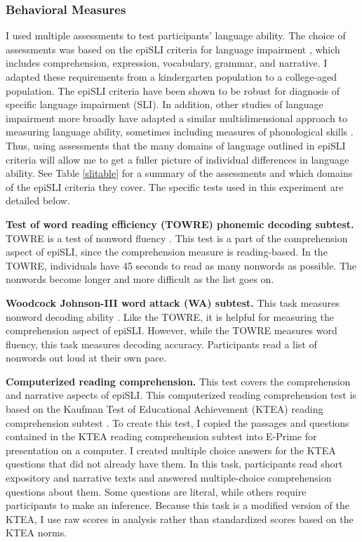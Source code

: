 \documentclass[../dissertation.tex]{subfiles}
\begin{document}
\subsubsection{Behavioral Measures}
	I used multiple assessments to test participants' language ability. The choice of assessments was based on the epiSLI criteria for language impairment \citep{Tomblin1996}, which includes comprehension, expression, vocabulary, grammar, and narrative. I adapted these requirements from a kindergarten population to a college-aged population. The epiSLI criteria have been shown to be robust for diagnosis of specific language impairment (SLI). In addition, other studies of language impairment more broadly have adapted a similar multidimensional approach to measuring language ability, sometimes including measures of phonological skills \citep{Catts2006}. Thus, using assessments that the many domains of language outlined in epiSLI criteria will allow me to get a fuller picture of individual differences in language ability. See Table \ref{slitable} for a summary of the assessments and which domains of the epiSLI criteria they cover. The specific tests used in this experiment are detailed below. \par
	\textbf{Test of word reading efficiency (TOWRE) phonemic decoding subtest.} TOWRE is a test of nonword fluency \citep{Torgesen1992}. This test is a part of the comprehension aspect of epiSLI, since the comprehension measure is reading-based. In the TOWRE, individuals have 45 seconds to read as many nonwords as possible. The nonwords become longer and more difficult as the list goes on. \par
	\textbf{Woodcock Johnson-III word attack (WA) subtest.} This task measures nonword decoding ability \citep{Woodcock2001}. Like the TOWRE, it is helpful for measuring the comprehension aspect of epiSLI. However, while the TOWRE measures word fluency, this task measures decoding accuracy. Participants read a list of nonwords out loud at their own pace. \par
	\textbf{Computerized reading comprehension.} This test covers the comprehension and narrative aspects of epiSLI. This computerized reading comprehension test is based on the Kaufman Test of Educational Achievement (KTEA) reading comprehension subtest \citep{Kaufman2004}. To create this test, I copied the passages and questions contained in the KTEA reading comprehension subtest into E-Prime \citep{schneider2002prime} for presentation on a computer. I created multiple choice answers for the KTEA questions that did not already have them. In this task, participants read short expository and narrative texts and answered multiple-choice comprehension questions about them. Some questions are literal, while others require participants to make an inference. Because this task is a modified version of the KTEA, I use raw scores in analysis rather than standardized scores based on the KTEA norms. \par
\end{document}
